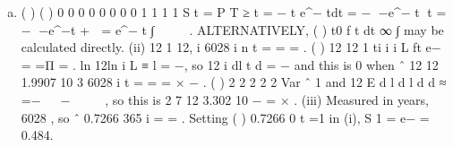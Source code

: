 \documentclass[a4paper,12pt]{article}
\begin{document}

\begin{enumerate}[(a)]
\item  ( ) ( ) 0 0 0 0
0 0 0 0
1 1 1 1 S t = P T ≥ t = − t \lambda e^{−\lambda} tdt = − −e^{−\lambda} t t = − −e^{−\lambda}t +  = e^{−\lambda} t ∫     .
ALTERNATIVELY, ( )
t0
f t dt ∞ ∫ may be calculated directly.
(ii)
12
1
12, i 6028
i
n t
=
= \sigma = .
( ) 12
12
1
ti
i
i
L ft e\lambda \lambda −
=
=Π = \sigma .
ln 12ln i L ≡ l = \lambda −\lambda\sigmat , so 12
i
dl t
d\lambda \lambda
= −\sigma
and this is 0 when ˆ 12 12 1.9907 10 3
6028 i t
\lambda = = = × − \sigma .
( ) 2
2 2 2
2
Var ˆ 1 and 12
E
d l
d l d
d
\lambda
\lambda \lambda
\lambda
≈ =−
 
−  
 
, so this is
2
7 12 3.302 10
\lambda − = × .
(iii) Measured in years, 6028 , so ˆ 0.7266
365 i \sigmat = \lambda = .
Setting ( ) 0.7266
0 t =1 in (i), S 1 = e− = 0.484.

\end{enumerate}
\end{document}
